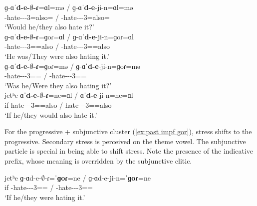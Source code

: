 \begin{exe}
	\ex \label{ex:past impf cluster}
	\begin{xlist}
		\ex \gll ɡ-ɑˈ\textbf{d-e-$\emptyset$-ɾ}=ɑl=mə / ɡ-ɑˈ\textbf{d-e}-ji-n=ɑl=mə 
		\\
		{\ind}-hate-{\thgloss}-{\pst}-3{\sg}=also={\q} / {\ind}-hate-{\thgloss}-{\pst}-3{\pl}=also={\q}
		\\ \trans `Would he/they also hate it?' 
		\\ 
		\ex \gll ɡ-ɑˈ\textbf{d-e-$\emptyset$-ɾ}=ɡoɾ=ɑl  / ɡ-ɑˈ\textbf{d-e}-ji-n=ɡoɾ=ɑl
		\\
		{\ind}-hate-{\thgloss}-{\pst}-3{\sg}={\prog}=also / {\ind}-hate-{\thgloss}-{\pst}-3{\pl}={\prog}=also
		\\ \trans `He was/They were also hating it.' 
		\\ 
		\ex \gll ɡ-ɑˈ\textbf{d-e-$\emptyset$-ɾ}=ɡoɾ=mə  / ɡ-ɑˈ\textbf{d-e}-ji-n=ɡoɾ=mə
		\\
		{\ind}-hate-{\thgloss}-{\pst}-3{\sg}={\prog}={\q} / {\ind}-hate-{\thgloss}-{\pst}-3{\pl}={\prog}={\q}
		\\ \trans `Was he/Were they also hating it?'
		\\ 
		\ex \gll jetʰe ɑˈ\textbf{d-e-$\emptyset$-ɾ}=ne=ɑl  /  ɑˈ\textbf{d-e}-ji-n=ne=ɑl
		\\
		if hate-{\thgloss}-{\pst}-3{\sg}={\sbjv}=also /  hate-{\thgloss}-{\pst}-3{\pl}={\sbjv}=also
		\\ \trans `If he/they would also hate it.' 
		\\ 
	\end{xlist}
\end{exe}

For the progressive + subjunctive cluster (\ref{ex:past impf gor}), stress shifts to the progressive. Secondary stress is perceived on the theme vowel. The subjunctive particle is special in being able to shift stress. Note the presence of the indicative prefix, whose meaning is overridden by the subjunctive clitic. 

\begin{exe}
	\ex \gll jetʰe ɡ-ɑd-e-$\emptyset$-ɾ=ˈ\textbf{ɡoɾ}=ne  /  ɡ-ɑd-e-ji-n=ˈ\textbf{ɡoɾ}=ne
	\\
	if {\ind}-hate-{\thgloss}-{\pst}-3{\sg}={\prog}={\sbjv}   /  {\ind}-hate-{\thgloss}-{\pst}-3{\pl}={\prog}={\sbjv} 
	\\ \trans `If he/they were hating it.' 
	\label{ex:past impf gor}
	\\ 
\end{exe}






















